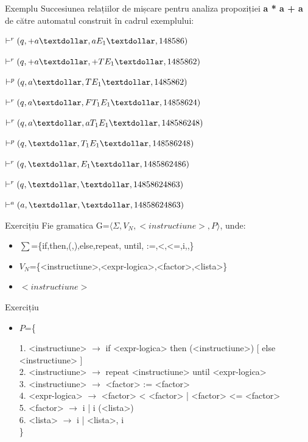 \documentclass[pdf]{beamer}
\begin{document}
\begin{frame}{Exemplu}
Succesiunea relațiilor de mișcare pentru analiza propoziției \textbf{a * a + a} de către automatul construit în cadrul exemplului:

$\vdash^{r} (q,+a\textdollar,aE_{1}\textdollar,148586)$

$\vdash^{r} (q,+a\textdollar,+TE_{1}\textdollar,1485862)$

$\vdash^{p} (q,a\textdollar,TE_{1}\textdollar,1485862)$

$\vdash^{r} (q,a\textdollar,FT_{1}E_{1}\textdollar,14858624)$ 

$\vdash^{r} (q,a\textdollar,aT_{1}E_{1}\textdollar,148586248)$

$\vdash^{p} (q,\textdollar,T_{1}E_{1}\textdollar,148586248)$ 

$\vdash^{r} (q,\textdollar,E_{1}\textdollar,1485862486)$

$\vdash^{r} (q,\textdollar,\textdollar,14858624863) $

$\vdash^{a} (a,\textdollar,\textdollar,14858624863)$
\end{frame}



\begin{frame}{Exercițiu}
Fie gramatica G=$\langle \Sigma, V_N, <instructiune>, P \rangle$, unde:

\begin{itemize}
\item
$\sum$=\{if,then,(,),else,repeat, until, :=,<,<=,i,,\}
\item
$V_N$=\{<instructiune>,<expr-logica>,<factor>,<lista>\}
\item
$<instructiune>$
\end{itemize}
\end{frame}



\begin{frame}{Exercițiu}
\begin{itemize}
\item
$P$=\{

1. <instructiune> $\rightarrow$ if <expr-logica> then (<instructiune>) [ else <instructiune> ]
\\
2. <instructiune> $\rightarrow$ repeat <instructiune> until <expr-logica>
\\
3. <instructiune> $\rightarrow$ <factor> := <factor>
\\
4. <expr-logica> $\rightarrow$ <factor> < <factor> | <factor> <= <factor>
\\
5. <factor> $\rightarrow$ i | i (<lista>)
\\
6. <lista> $\rightarrow$ i | <lista>, i
\\
\}
\end{itemize}
\end{frame}
\end{document}
